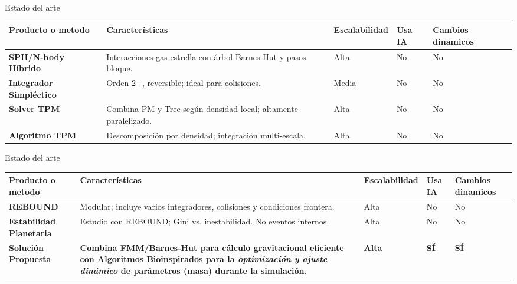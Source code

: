 \begin{frame}{Estado del arte}
    \centering
    \label{tab:arte}
    \vspace{-0.1cm}
    \begin{adjustbox}{max width=0.9\textwidth,max height=0.7\textheight, keepaspectratio}
        \renewcommand{\arraystretch}{1.3}
            \begin{tabular}{@{}>{\bfseries}p{} p{} p{} p{} p{}@{}}
            \toprule
            \textbf{Producto o metodo} & \textbf{Características} & \textbf{Escalabilidad} & \textbf{Usa IA} & \textbf{Cambios dinamicos} \\
            \midrule
            SPH/N-body Híbrido & Interacciones gas-estrella con árbol Barnes-Hut y pasos bloque. & Alta & No & No \\
            Integrador Simpléctico & Orden 2+, reversible; ideal para colisiones. & Media & No & No \\
            Solver TPM & Combina PM y Tree según densidad local; altamente paralelizado. & Alta & No & No \\
            Algoritmo TPM & Descomposición por densidad; integración multi-escala. & Alta & No & No \\
            \bottomrule
            \end{tabular}
    \end{adjustbox}
    \smallskip
\end{frame}


\begin{frame}{Estado del arte}
    \centering
    \label{tab:arte}
    \vspace{-0.1cm}
    \begin{adjustbox}{max width=0.9\textwidth,max height=0.7\textheight, keepaspectratio}
        \renewcommand{\arraystretch}{1.3}
            \begin{tabular}{@{}>{\bfseries}p{} p{} p{} p{} p{}@{}}
            \toprule
            \textbf{Producto o metodo} & \textbf{Características} & \textbf{Escalabilidad} & \textbf{Usa IA} & \textbf{Cambios dinamicos} \\
            \midrule
            REBOUND & Modular; incluye varios integradores, colisiones y condiciones frontera. & Alta & No & No \\
            Estabilidad Planetaria & Estudio con REBOUND; Gini vs. inestabilidad. No eventos internos. & Alta & No & No \\
            \midrule
            \rowcolor{yellow!20}
            \textbf{Solución Propuesta} & \textbf{Combina FMM/Barnes-Hut para cálculo gravitacional eficiente con Algoritmos Bioinspirados para la \textit{optimización y ajuste dinámico} de parámetros (masa) durante la simulación.}  & \textbf{Alta} & \textbf{SÍ} & \textbf{SÍ} \\
            \bottomrule
            \end{tabular}
    \end{adjustbox}
    \smallskip
\end{frame}

